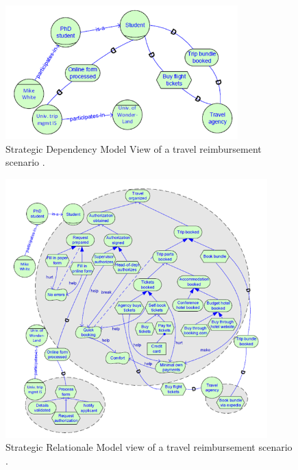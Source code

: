 \documentclass[11pt,a4paper]{article}
\begin{document}
\begin{figure}[ht]
    \centering
    \includegraphics[width=0.8\textwidth]{sdModel.png}
    \caption{Strategic Dependency Model View of a travel reimbursement
      scenario \cite{Dalpiaz.25.05.2016}.}
    \label{fig:my_label2}
\end{figure}

\begin{figure}[ht]
    \centering
    \includegraphics[width=0.9\textwidth]{fullmodelistar.png}
    \caption{Strategic Relationale Model view of a travel reimbursement
      scenario \cite{Dalpiaz.25.05.2016}.}
    \label{fig:my_label1}
\end{figure}
\end{document}

